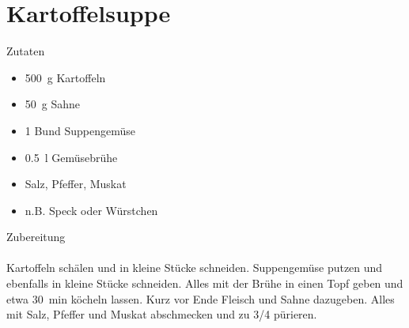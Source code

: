 \section*{Kartoffelsuppe}
\ihead{}\ohead{}
\cfoot{}
{\Large Zutaten}
\begin{multicols}{2}
\begin{itemize}
    \item \SI{500}{g} Kartoffeln
    \item \SI{50}{g} Sahne
    \item \num{1} Bund Suppengemüse
    \item \SI{0.5}{l} Gemüsebrühe
    \item Salz, Pfeffer, Muskat
    \item n.B. Speck oder Würstchen
\end{itemize}
\end{multicols}
\noindent
{\Large Zubereitung}\\
\\
Kartoffeln schälen und in kleine Stücke schneiden.
Suppengemüse putzen und ebenfalls in kleine Stücke schneiden.
Alles mit der Brühe in einen Topf geben und etwa \SI{30}{min} köcheln lassen. 
Kurz vor Ende Fleisch und Sahne dazugeben. 
Alles mit Salz, Pfeffer und Muskat abschmecken und zu \num{3/4} pürieren.